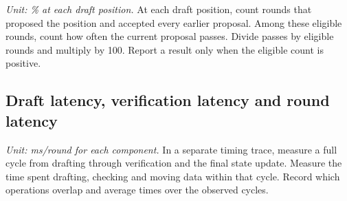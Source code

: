 \textit{Unit: \% at each draft position.} At each draft position, count rounds that proposed the position and accepted every earlier proposal. Among these eligible rounds, count how often the current proposal passes. Divide passes by eligible rounds and multiply by 100. Report a result only when the eligible count is positive.

\subsection{Draft latency, verification latency and round latency}

\textit{Unit: ms/round for each component.} In a separate timing trace, measure a full cycle from drafting through verification and the final state update. Measure the time spent drafting, checking and moving data within that cycle. Record which operations overlap and average times over the observed cycles.